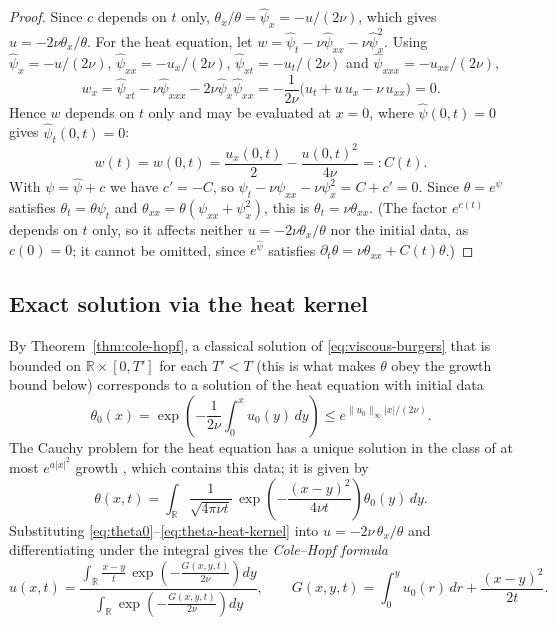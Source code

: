 \begin{proof}
Since $c$ depends on $t$ only, $\theta_x/\theta=\hat\psi_x=-u/(2\nu)$, which
gives $u=-2\nu\theta_x/\theta$. For the heat equation, let
$w=\hat\psi_t-\nu\hat\psi_{xx}-\nu\hat\psi_x^2$. Using
$\hat\psi_x=-u/(2\nu)$, $\hat\psi_{xx}=-u_x/(2\nu)$,
$\hat\psi_{xt}=-u_t/(2\nu)$ and $\hat\psi_{xxx}=-u_{xx}/(2\nu)$,
\begin{equation}
  w_x=\hat\psi_{xt}-\nu\hat\psi_{xxx}-2\nu\hat\psi_x\hat\psi_{xx}
  =-\frac{1}{2\nu}\big(u_t+u\,u_x-\nu\,u_{xx}\big)=0 .
\end{equation}
Hence $w$ depends on $t$ only and may be evaluated at $x=0$, where
$\hat\psi(0,t)=0$ gives $\hat\psi_t(0,t)=0$:
\begin{equation}
  w(t)=w(0,t)=\frac{u_x(0,t)}{2}-\frac{u(0,t)^2}{4\nu}=:C(t).
\end{equation}
With $\psi=\hat\psi+c$ we have $c'=-C$, so $\psi_t-\nu\psi_{xx}-\nu\psi_x^2=
C+c'=0$. Since $\theta=e^{\psi}$ satisfies $\theta_t=\theta\psi_t$ and
$\theta_{xx}=\theta(\psi_{xx}+\psi_x^2)$, this is $\theta_t=\nu\theta_{xx}$. (The
factor $e^{c(t)}$ depends on $t$ only, so it affects neither $u=-2\nu\theta_x/\theta$
nor the initial data, as $c(0)=0$; it cannot be omitted, since $e^{\hat\psi}$
satisfies $\partial_t\theta=\nu\theta_{xx}+C(t)\theta$.)
\end{proof}



\subsection{Exact solution via the heat kernel}
\label{subsec:cole-hopf-solution}

By Theorem~\ref{thm:cole-hopf}, a classical solution of \eqref{eq:viscous-burgers}
that is bounded on $\mathbb{R}\times[0,T']$ for each $T'<T$ (this is what makes
$\theta$ obey the growth bound below) corresponds to a solution of the heat
equation with initial data
\begin{equation}
  \label{eq:theta0}
  \theta_0(x) = \exp\left(-\frac{1}{2\nu}\int_0^x u_0(y)\, dy\right)
  \le e^{\|u_0\|_\infty|x|/(2\nu)} .
\end{equation}
The Cauchy problem for the heat equation has a unique solution in the class of
at most $e^{a|x|^2}$ growth \cite[\S2.3.3]{evans2010}, which contains this
data; it is given by
\begin{equation}
  \label{eq:theta-heat-kernel}
  \theta(x,t) = \int_{\mathbb{R}} \frac{1}{\sqrt{4\pi\nu t}}\,
    \exp\left(-\frac{(x-y)^2}{4\nu t}\right) \theta_0(y)\, dy.
\end{equation}
Substituting \eqref{eq:theta0}--\eqref{eq:theta-heat-kernel} into
$u=-2\nu\,\theta_x/\theta$ and differentiating under the integral gives the
\emph{Cole--Hopf formula}
\begin{equation}
  \label{eq:cole-hopf-formula}
  u(x,t) = \frac{\displaystyle\int_{\mathbb{R}} \frac{x-y}{t}\, \exp\left(-\frac{G(x,y,t)}{2\nu}\right) dy}
                {\displaystyle\int_{\mathbb{R}} \exp\left(-\frac{G(x,y,t)}{2\nu}\right) dy},
  \qquad
  G(x,y,t) = \int_0^y u_0(r)\, dr + \frac{(x-y)^2}{2t}.
\end{equation}

